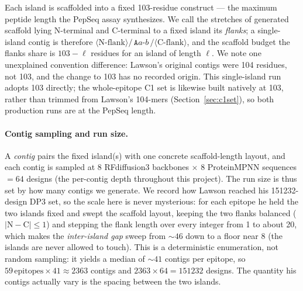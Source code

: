Each island is scaffolded into a fixed \num{103}-residue construct --- the maximum peptide
length the PepSeq assay synthesizes. We call the stretches of generated scaffold lying
N-terminal and C-terminal to a fixed island its \emph{flanks}; a single-island contig is
therefore $\langle\text{N-flank}\rangle/\,\texttt{A}a\text{-}b\,/\langle\text{C-flank}\rangle$,
and the scaffold budget the flanks share is $103-\ell$ residues for an island of length
$\ell$. We note one unexplained convention difference: Lawson's original contigs were
\num{104} residues, not \num{103}, and the change to \num{103} has no recorded origin. This
single-island run adopts \num{103} directly; the whole-epitope C1 set is likewise built natively at
\num{103}, rather than trimmed from Lawson's \num{104}-mers (Section~\ref{sec:c1set}), so both production
runs are at the PepSeq length.

\paragraph{Contig sampling and run size.}
A \emph{contig} pairs the fixed island(s) with one concrete scaffold-length layout, and each
contig is sampled at \num{8} RFdiffusion3 backbones $\times$ \num{8} ProteinMPNN sequences
$=\num{64}$ designs (the per-contig depth throughout this project). The run size is thus set
by how many contigs we generate. We record how Lawson reached his \num{151232}-design DP3 set,
so the scale here is never mysterious: for each epitope he held the two islands fixed and swept
the scaffold layout, keeping the two flanks balanced ($|\text{N}-\text{C}|\le 1$) and stepping
the flank length over every integer from \num{1} to about \num{20}, which makes the
\emph{inter-island gap} sweep from $\sim\!\num{46}$ down to a floor near \num{8} (the islands
are never allowed to touch). This is a deterministic enumeration, not random sampling: it
yields a median of $\sim\!\num{41}$ contigs per epitope, so $\num{59}\,\text{epitopes}\times
41 \approx \num{2363}$ contigs and $\num{2363}\times\num{64}=\num{151232}$ designs. The
quantity his contigs actually vary is the spacing between the two islands.

